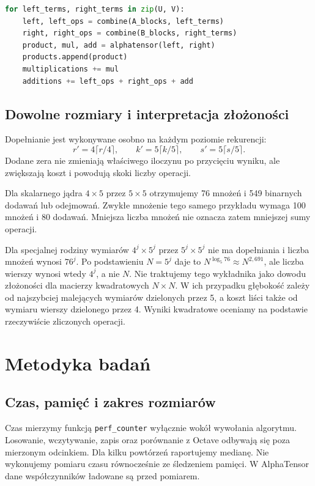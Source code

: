\documentclass[11pt,a4paper]{article}
\begin{document}
\begin{lstlisting}[language=Python,caption={Wykorzystanie współczynników w implementacji.}]
for left_terms, right_terms in zip(U, V):
    left, left_ops = combine(A_blocks, left_terms)
    right, right_ops = combine(B_blocks, right_terms)
    product, mul, add = alphatensor(left, right)
    products.append(product)
    multiplications += mul
    additions += left_ops + right_ops + add
\end{lstlisting}

\subsection{Dowolne rozmiary i interpretacja złożoności}
Dopełnianie jest wykonywane osobno na każdym poziomie rekurencji:
\[
r'=4\lceil r/4\rceil,\qquad k'=5\lceil k/5\rceil,
\qquad s'=5\lceil s/5\rceil.
\]
Dodane zera nie zmieniają właściwego iloczynu po przycięciu wyniku,
ale zwiększają koszt i powodują skoki liczby operacji.

Dla skalarnego jądra $4\times5$ przez $5\times5$ otrzymujemy
76 mnożeń i 549 binarnych dodawań lub odejmowań.
Zwykłe mnożenie tego samego przykładu wymaga 100 mnożeń i 80 dodawań.
Mniejsza liczba mnożeń nie oznacza zatem mniejszej sumy operacji.

Dla specjalnej rodziny wymiarów $4^j\times5^j$ przez $5^j\times5^j$
nie ma dopełniania i liczba mnożeń wynosi $76^j$.
Po podstawieniu $N=5^j$ daje to $N^{\log_5 76}\approx N^{2{,}691}$,
ale liczba wierszy wynosi wtedy $4^j$, a nie $N$.
Nie traktujemy tego wykładnika jako dowodu złożoności dla macierzy
kwadratowych $N\times N$. W ich przypadku głębokość zależy od
najszybciej malejących wymiarów dzielonych przez 5, a koszt liści
także od wymiaru wierszy dzielonego przez 4.
Wyniki kwadratowe oceniamy na podstawie rzeczywiście zliczonych operacji.

\section{Metodyka badań}
\subsection{Czas, pamięć i zakres rozmiarów}
Czas mierzymy funkcją \texttt{perf\_counter} wyłącznie wokół wywołania
algorytmu. Losowanie, wczytywanie, zapis oraz porównanie z Octave odbywają
się poza mierzonym odcinkiem. Dla kilku powtórzeń raportujemy medianę.
Nie wykonujemy pomiaru czasu równocześnie ze śledzeniem pamięci.
W AlphaTensor dane współczynników ładowane są przed pomiarem.
\end{document}
